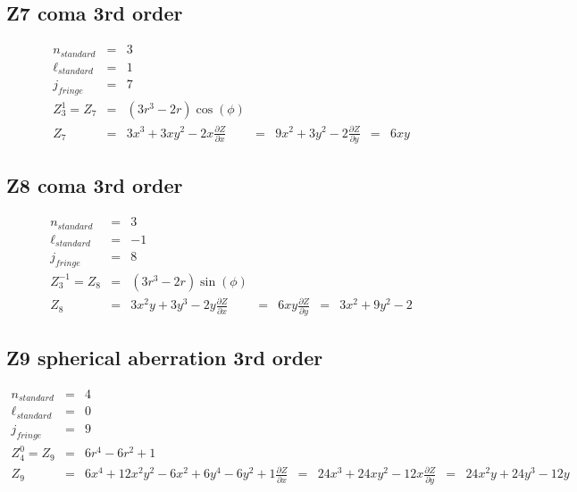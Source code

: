 \documentclass[10pt]{article}
\begin{document}
  \subsection{Z7 coma 3rd order}
    \begin{subequations}
    \begin{eqnarray}
        n_{standard} &=&3\\
        \ell_{standard} &=&1\\
        j_{fringe} &=&7\\
        Z_{3}^{1} = Z_{7} &=& \left(3 r^{3} - 2 r\right) \cos{\left(\phi \right)}\\
        Z_{7} &=& 3 x^{3} + 3 x y^{2} - 2 x
        \frac{\partial Z}{\partial x} &=& 9 x^{2} + 3 y^{2} - 2
        \frac{\partial Z}{\partial y} &=& 6 x y
    \end{eqnarray}
    \end{subequations}
  \subsection{Z8 coma 3rd order}
    \begin{subequations}
    \begin{eqnarray}
        n_{standard} &=&3\\
        \ell_{standard} &=&-1\\
        j_{fringe} &=&8\\
        Z_{3}^{-1} = Z_{8} &=& \left(3 r^{3} - 2 r\right) \sin{\left(\phi \right)}\\
        Z_{8} &=& 3 x^{2} y + 3 y^{3} - 2 y
        \frac{\partial Z}{\partial x} &=& 6 x y
        \frac{\partial Z}{\partial y} &=& 3 x^{2} + 9 y^{2} - 2
    \end{eqnarray}
    \end{subequations}
  \subsection{Z9 spherical aberration 3rd order}
    \begin{subequations}
    \begin{eqnarray}
        n_{standard} &=&4\\
        \ell_{standard} &=&0\\
        j_{fringe} &=&9\\
        Z_{4}^{0} = Z_{9} &=& 6 r^{4} - 6 r^{2} + 1\\
        Z_{9} &=& 6 x^{4} + 12 x^{2} y^{2} - 6 x^{2} + 6 y^{4} - 6 y^{2} + 1
        \frac{\partial Z}{\partial x} &=& 24 x^{3} + 24 x y^{2} - 12 x
        \frac{\partial Z}{\partial y} &=& 24 x^{2} y + 24 y^{3} - 12 y
    \end{eqnarray}
    \end{subequations}
\end{document}
